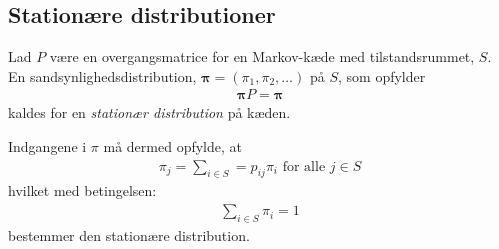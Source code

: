 \subsection{Stationære distributioner}


\begin{minipage}\textwidth
\begin{defn}\textbf{} %
\newline
Lad $P$ være en overgangsmatrice for en Markov-kæde med tilstandsrummet, $S$. En sandsynlighedsdistribution, $\bm\pi=(\pi_1,\pi_2,\dots)$ på $S$, som opfylder
\begin{align*}
    \bm\pi P=\bm\pi
\end{align*}
kaldes for en \textit{stationær distribution} på kæden. 
\end{defn}
\end{minipage}

Indgangene i $\pi$ må dermed opfylde, at
\begin{align*}
    \pi_j=\sum_{i\in S}=p_{ij}\pi_i \text{ for alle } j\in S
\end{align*}
hvilket med betingelsen:
\begin{align*}
    \sum_{i\in S} \pi_i=1
\end{align*}
bestemmer den stationære distribution. 

